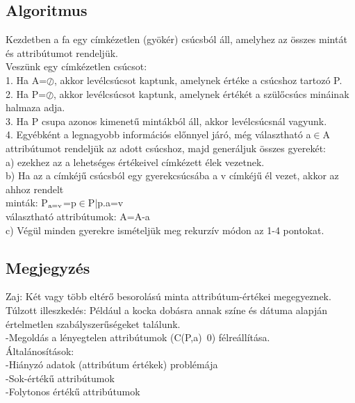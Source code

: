 \documentclass{article}
\begin{document}
	 \subsection{Algoritmus}
	 Kezdetben a fa egy címkézetlen (gyökér) csúcsból áll, amelyhez az összes mintát és attribútumot rendeljük.\\
	 Veszünk egy címkézetlen csúcsot:\\
	 1. Ha A=$\oslash$, akkor levélcsúcsot kaptunk, amelynek értéke a csúcshoz tartozó P.\\
	 2. Ha P=$\oslash$, akkor levélcsúcsot kaptunk, amelynek értékét a szülőcsúcs mináinak halmaza adja.\\
	 3. Ha P csupa azonos kimenetű mintákból áll, akkor levélcsúcsnál vagyunk.\\
	 4. Egyébként a legnagyobb információs előnnyel járó, még választható a$\in$A attribútumot rendeljük az adott csúcshoz, majd generáljuk összes gyerekét: \\
	 a) ezekhez az a lehetséges értékeivel címkézett élek vezetnek.\\
	 b) Ha az a címkéjű csúcsból egy gyerekcsúcsába a v címkéjű él vezet, akkor az ahhoz rendelt\\
	 minták: P$\textsubscript{a=v}$={p$\in$P$|$p.a=v}\\
	 választható attribútumok: A=A-{a}\\
	 c) Végül minden gyerekre ismételjük meg rekurzív módon az 1-4 pontokat.\\
	 
	 \subsection{Megjegyzés}
	 Zaj: Két vagy több eltérő besorolású minta attribútum-értékei megegyeznek.\\
	 Túlzott illeszkedés: Például a kocka dobásra annak színe és dátuma alapján értelmetlen szabályszerűségeket találunk.\\
	 -Megoldás a lényegtelen attribútumok (C(P,a)~0) félreállítása.\\
	 Általánosítások:\\
	 -Hiányzó adatok (attribútum értékek) problémája\\
	 -Sok-értékű attribútumok\\
	 -Folytonos értékű attribútumok
	 
\end{document}
